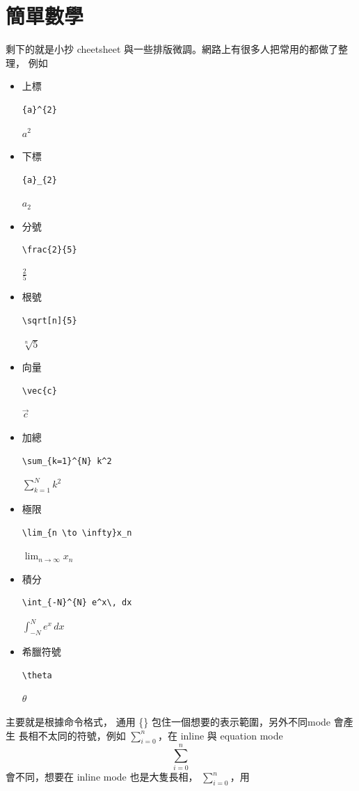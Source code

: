 \section{簡單數學}
剩下的就是小抄 cheetsheet 與一些排版微調。網路上有很多人把常用的都做了整理，
例如
  \begin{itemize}
    \item 上標
      \begin{verbatim}
{a}^{2}
      \end{verbatim}
      ${a}^{2}$
    \item 下標
      \begin{verbatim}
{a}_{2}
      \end{verbatim}
      ${a}_{2}$
    \item 分號
      \begin{verbatim}
\frac{2}{5}
      \end{verbatim}
      $\frac{2}{5}$
    \item 根號
      \begin{verbatim}
\sqrt[n]{5}
      \end{verbatim}
      $\sqrt[n]{5}$
    \item 向量
      \begin{verbatim}
\vec{c}
      \end{verbatim}
      $\vec{c}$
    \item 加總
      \begin{verbatim}
\sum_{k=1}^{N} k^2
      \end{verbatim}
      $\sum_{k=1}^{N} k^2$
    \item 極限
      \begin{verbatim}
\lim_{n \to \infty}x_n
      \end{verbatim}
      $\lim_{n \to \infty}x_n$
    \item 積分
      \begin{verbatim}
\int_{-N}^{N} e^x\, dx
      \end{verbatim}
      $\int_{-N}^{N} e^x\, dx$
    \item 希臘符號
      \begin{verbatim}
\theta
      \end{verbatim}
      $\theta$
  \end{itemize}
主要就是根據命令格式， 通用 \{\} 包住一個想要的表示範圍，另外不同mode 會產生
長相不太同的符號，例如 $\sum_{i=0}^{n}$，在 inline 與 equation mode
\begin{equation*}
  \sum_{i=0}^{n}
\end{equation*}
會不同，想要在 inline mode 也是大隻長相， $\displaystyle\sum_{i=0}^{n}$，用
